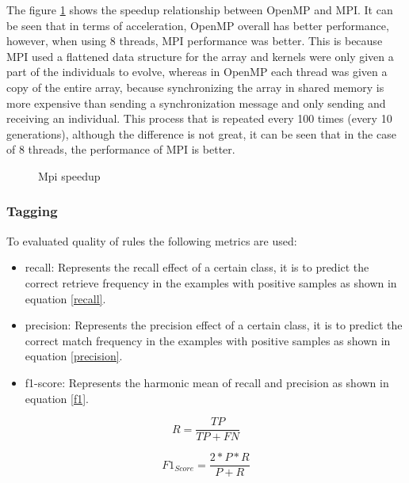 \documentclass{IEEEtran}
\begin{document}

The figure \ref{fig:mpi speed} shows the speedup relationship between OpenMP and MPI. It can be seen that in terms of acceleration, OpenMP overall has better performance, however, when using 8 threads, MPI performance was better. This is because MPI used a flattened data structure for the array and kernels were only given a part of the individuals to evolve, whereas in OpenMP each thread was given a copy of the entire array, because synchronizing the array in shared memory is more expensive than sending a synchronization message and only sending and receiving an individual. This process that is repeated every 100 times (every 10 generations), although the difference is not great, it can be seen that in the case of 8 threads, the performance of MPI is better.

\begin{figure}[ht]
  \centering
  
  \caption{Mpi speedup}
  \label{fig:mpi speed}
\end{figure}


\subsubsection{Tagging}

To evaluated quality of rules the following metrics are used:
\begin{itemize}
  \item recall: Represents the recall effect of a certain class, it is to predict the correct retrieve frequency in the examples with positive samples as shown in equation \ref{recall}.
  \item precision: Represents the precision effect of a certain class, it is to predict the correct match frequency in the examples with positive samples as shown in equation \ref{precision}.
  \item f1-score: Represents the harmonic mean of recall and precision as shown in equation \ref{f1}.
\end{itemize}

\begin{equation}
  \label{recall}
  R = \frac{TP}{TP + FN}
\end{equation}

\begin{equation}
  \label{f1}
  F1_{Score} = \frac{2*P*R}{P + R}
\end{equation}
\end{document}
